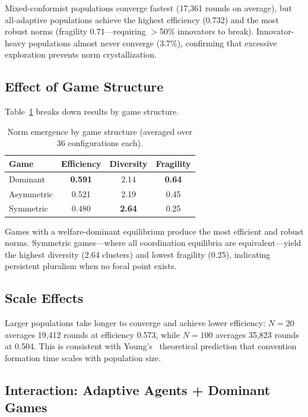 \documentclass[11pt]{article}
\begin{document}
Mixed-conformist populations converge fastest (17,361 rounds on average), but all-adaptive populations achieve the highest efficiency (0.732) and the most robust norms (fragility 0.71---requiring $>$50\% innovators to break).
Innovator-heavy populations almost never converge (3.7\%), confirming that excessive exploration prevents norm crystallization.

\subsection{Effect of Game Structure}

Table~\ref{tab:game} breaks down results by game structure.

\begin{table}[h]
\centering
\small
\caption{Norm emergence by game structure (averaged over 36 configurations each).}
\label{tab:game}
\begin{tabular}{lccc}
\toprule
\textbf{Game} & \textbf{Efficiency} & \textbf{Diversity} & \textbf{Fragility} \\
\midrule
Dominant   & \textbf{0.591} & 2.14 & \textbf{0.64} \\
Asymmetric & 0.521 & 2.19 & 0.45 \\
Symmetric  & 0.480 & \textbf{2.64} & 0.25 \\
\bottomrule
\end{tabular}
\end{table}

Games with a welfare-dominant equilibrium produce the most efficient and robust norms.
Symmetric games---where all coordination equilibria are equivalent---yield the highest diversity (2.64 clusters) and lowest fragility (0.25), indicating persistent pluralism when no focal point exists.

\subsection{Scale Effects}

Larger populations take longer to converge and achieve lower efficiency: $N\!=\!20$ averages 19,412 rounds at efficiency 0.573, while $N\!=\!100$ averages 35,823 rounds at 0.504.
This is consistent with Young's~\cite{young1993evolution} theoretical prediction that convention formation time scales with population size.

\subsection{Interaction: Adaptive Agents + Dominant Games}
\end{document}
